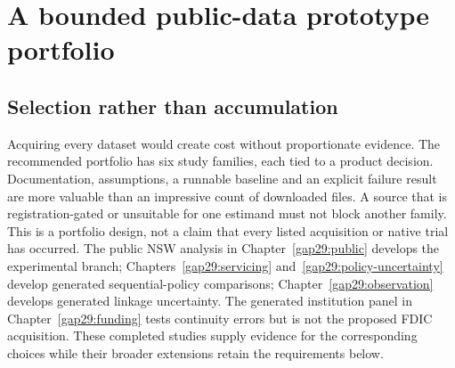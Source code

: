 \hypertarget{pd15:portfolio}{%
\chapter{A bounded public-data prototype
portfolio}\label{pd15:portfolio}}

\hypertarget{selection-rather-than-accumulation}{%
\section{Selection rather than
accumulation}\label{selection-rather-than-accumulation}}

Acquiring every dataset would create cost without proportionate
evidence. The recommended portfolio has six study families, each tied to
a product decision. Documentation, assumptions, a runnable baseline and
an explicit failure result are more valuable than an impressive count of
downloaded files. A source that is registration-gated or unsuitable for
one estimand must not block another family. This is a portfolio design, not a claim that every listed acquisition or native trial has occurred. The public NSW analysis in Chapter~\ref{gap29:public} develops the experimental branch; Chapters~\ref{gap29:servicing} and~\ref{gap29:policy-uncertainty} develop generated sequential-policy comparisons; Chapter~\ref{gap29:observation} develops generated linkage uncertainty. The generated institution panel in Chapter~\ref{gap29:funding} tests continuity errors but is not the proposed FDIC acquisition. These completed studies supply evidence for the corresponding choices while their broader extensions retain the requirements below.

